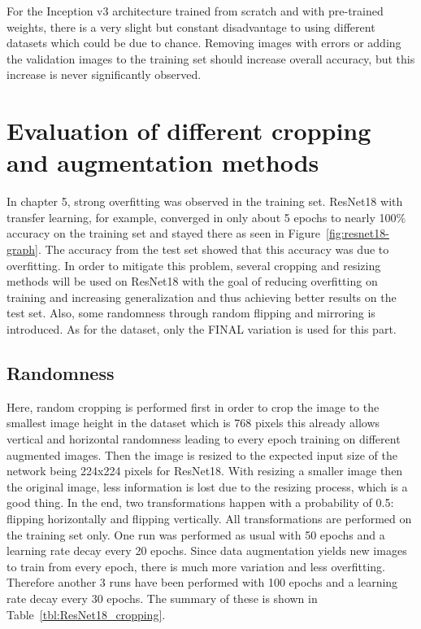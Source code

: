 For the Inception v3 architecture trained from scratch and with pre-trained weights, there is a very slight but constant disadvantage to using different datasets which could be due to chance. Removing images with errors or adding the validation images to the training set should increase overall accuracy, but this increase is never significantly observed.












\section{Evaluation of different cropping and augmentation methods}

In chapter 5, strong overfitting was observed in the training set. ResNet18 with transfer learning, for example, converged in only about 5 epochs to nearly 100\% accuracy on the training set and stayed there as seen in Figure~\ref{fig:resnet18-graph}. The accuracy from the test set showed that this accuracy was due to overfitting. In order to mitigate this problem, several cropping and resizing methods will be used on ResNet18 with the goal of reducing overfitting on training and increasing generalization and thus achieving better results on the test set. Also, some randomness through random flipping and mirroring is introduced. As for the dataset, only the FINAL variation is used for this part.

\subsection{Randomness}

Here, random cropping is performed first in order to crop the image to the smallest image height in the dataset which is 768 pixels this already allows vertical and horizontal randomness leading to every epoch training on different augmented images. Then the image is resized to the expected input size of the network being 224x224 pixels for ResNet18. With resizing a  smaller image then the original image, less information is lost due to the resizing process, which is a good thing. In the end, two transformations happen with a probability of 0.5: flipping horizontally and flipping vertically. All transformations are performed on the training set only. One run was performed as usual with 50 epochs and a  learning rate decay every 20 epochs. Since data augmentation yields new images to train from every epoch, there is much more variation and less overfitting. Therefore another 3 runs have been performed with 100 epochs and a learning rate decay every  30 epochs. The summary of these is shown in Table~\ref{tbl:ResNet18_cropping}. \\


